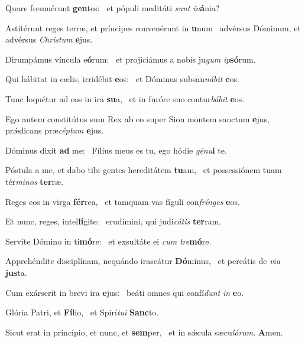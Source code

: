 \item Quare fremuérunt \textbf{gen}tes:~\psstar{} et pópuli meditáti \textit{sunt} \textit{in}\textbf{á}nia?
\item Astitérunt reges terræ, et príncipes convenérunt in \textbf{u}num~\psstar{} advérsus Dóminum, et advérsus \textit{Christum} \textbf{e}jus.
\item Dirumpámus víncula e\textbf{ó}rum:~\psstar{} et projiciámus a nobis ju\textit{gum} \textit{ip}\textbf{só}rum.
\item Qui hábitat in cælis, irridébit \textbf{e}os:~\psstar{} et Dóminus subsan\textit{nábit} \textbf{e}os.
\item Tunc loquétur ad eos in ira \textbf{su}a,~\psstar{} et in furóre suo contur\textit{bábit} \textbf{e}os.
\item Ego autem constitútus sum Rex ab eo super Sion montem sanctum \textbf{e}jus,~\psstar{} prǽdicans præ\textit{céptum} \textbf{e}jus.
\item Dóminus dixit \textbf{ad} me:~\psstar{} Fílius meus es tu, ego hódie \textit{génu}\textbf{i} te.
\item Póstula a me, et dabo tibi gentes hereditátem \textbf{tu}am,~\psstar{} et possessiónem tuam tér\textit{minos} \textbf{ter}ræ.
\item Reges eos in virga \textbf{fér}rea,~\psstar{} et tamquam vas fíguli con\textit{frínges} \textbf{e}os.
\item Et nunc, reges, intel\textbf{lí}gite:~\psstar{} erudímini, qui judi\textit{cátis} \textbf{ter}ram.
\item Servíte Dómino in ti\textbf{mó}re:~\psstar{} et exsultáte ei \textit{cum} \textit{tre}\textbf{mó}re.
\item Apprehéndite disciplínam, nequándo irascátur \textbf{Dó}minus,~\psstar{} et pereátis de \textit{via} \textbf{jus}ta.
\item Cum exárserit in brevi ira \textbf{e}jus:~\psstar{} beáti omnes qui confí\textit{dunt} \textit{in} \textbf{e}o.
\item Glória Patri, et \textbf{Fí}lio,~\psstar{} et Spirí\textit{tui} \textbf{Sanc}to.
\item Sicut erat in princípio, et nunc, et \textbf{sem}per,~\psstar{} et in sǽcula sæcu\textit{lórum}. \textbf{A}men.
